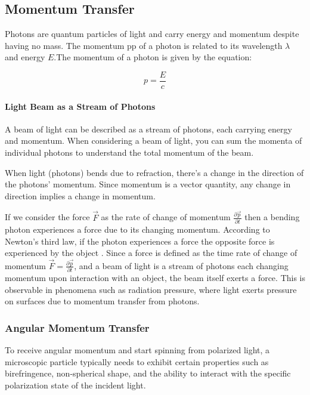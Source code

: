 \documentclass[12pt,english]{scrartcl}
\begin{document}
\subsection{Momentum Transfer}\label{sec:momentumTransfer}


Photons are quantum particles of light and carry energy and momentum despite
having no mass. The momentum pp of a photon is related to its wavelength
$\lambda$ and energy $E$\cite{einsteinZurQuantentheoriederStrahlung1917}.The
momentum of a photon is given by the equation:

\begin{equation}
	p = \frac{E}{c}
\end{equation}

\paragraph{Light Beam as a Stream of Photons}

A beam of light can be described as a stream of photons, each carrying energy
and momentum. When considering a beam of light, you can sum the momenta of
individual photons to understand the total momentum of the beam.

When light (photons) bends due to refraction, there's a change in the direction
of the photons' momentum. Since momentum is a vector quantity, any change in
direction implies a change in momentum.

If we consider the force $\vec{F}$ as the rate of change of momentum
$\frac{\partial\vec{p}}{\partial t}$ then a bending photon experiences a force
due to its changing momentum. According to Newton's third law, if the photon
experiences a force the opposite force is experienced by the object . Since a
force is defined as the time rate of change of momentum $\vec{F} =
	\frac{\partial\vec{p}}{\partial t}$, and a beam of light is a stream of photons
each changing momentum upon interaction with an object, the beam itself exerts
a force. This is observable in phenomena such as radiation pressure, where
light exerts pressure on surfaces due to momentum transfer from
photons.\cite{bustamanteOpticalTweezersSinglemolecule2021}


\subsubsection{Angular Momentum Transfer}\label{sec:angularMomentumTransfer}
To receive angular momentum and start spinning from polarized light, a
microscopic particle typically needs to exhibit certain properties such as
birefringence, non-spherical shape, and the ability to interact with the
specific polarization state of the incident light.
\end{document}
